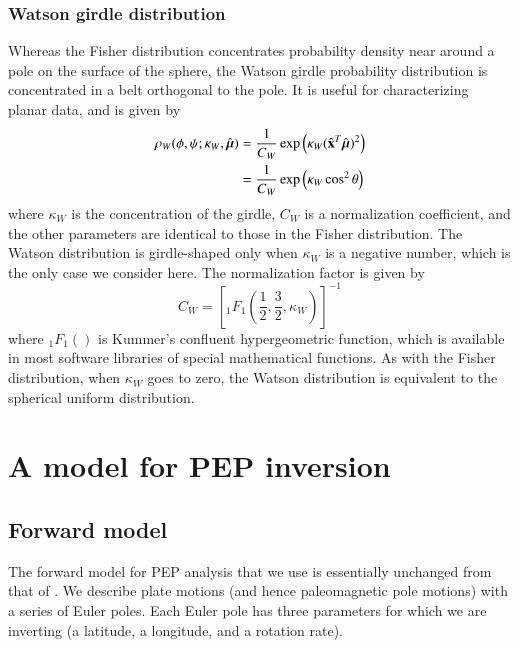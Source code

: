 \documentclass[preprint,12pt,authoryear]{elsarticle}
\newcommand{\mitbf}[1]{\hbox{\mathversion{bold}$#1$}}
\begin{document}
\subsubsection{Watson girdle distribution}
Whereas the Fisher distribution concentrates probability density near around a pole on
the surface of the sphere, the Watson girdle probability distribution is concentrated
in a belt orthogonal to the pole. It is useful for characterizing planar data, and is given by
\begin{equation}
  \begin{aligned}
  \rho_W(\phi, \psi; \kappa_W, \hat{\mitbf{\mu}}) 
  &= \frac{1}{C_W} \exp \left( \kappa_W (\hat{\mathbf{x}}^T \hat{\mitbf{\mu}})^2 \right) \\
  &= \frac{1}{C_W} \exp \left( \kappa_W \cos^2 \theta \right)
  \end{aligned}
\label{eq:watson}
\end{equation}
where $\kappa_W$ is the concentration of the girdle, $C_W$ is a normalization coefficient,
and the other parameters are identical to those in the Fisher distribution.
The Watson distribution is girdle-shaped only when $\kappa_W$ is a negative number, 
which is the only case we consider here.
The normalization factor is given by
\begin{equation}
  C_W = \left[ {}_1 F_1 \left( \frac{1}{2}, \frac{3}{2}, \kappa_W \right) \right]^{-1}
\end{equation}
where ${}_1 F_1()$ is Kummer's confluent hypergeometric function, which is available
in most software libraries of special mathematical functions.
As with the Fisher distribution, when $\kappa_W$ goes to zero, 
the Watson distribution is equivalent to the spherical uniform distribution.

\section{A model for PEP inversion}
\label{sec:model}
\subsection{Forward model}
\label{sec:forward_model}
The forward model for PEP analysis that we use is essentially unchanged from that of \citet{gordon1984paleomagnetic}.
We describe plate motions (and hence paleomagnetic pole motions) with a series of Euler poles.
Each Euler pole has three parameters for which we are inverting (a latitude, a longitude, and a rotation rate).
\end{document}
